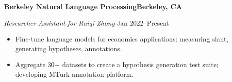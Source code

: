 \textbf{Berkeley Natural Language Processing\hfill Berkeley, CA}\par
\textit{Researcher Assistant for Ruiqi Zhong} \hfill Jan 2022--Present\par
\begin{itemize}
	\item Fine-tune language models for economics applications: measuring slant, generating hypotheses, annotations.
	\item Aggregate 30+ datasets to create a hypothesis generation test suite; developing MTurk annotation platform.
\end{itemize} \par